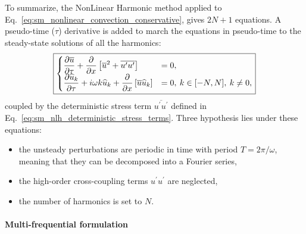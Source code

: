To summarize, the NonLinear Harmonic
method applied to Eq.~\ref{eq:sm_nonlinear_convection_conservative},
gives $2N + 1$ equations. A pseudo-time ($\tau$) derivative is
added to march the equations in pseudo-time to the steady-state 
solutions of all the harmonics:
\begin{equation}
	\fbox{$
	\begin{cases}
		\displaystyle \frac{\partial \overline{u}}{\partial \tau} + 
		\frac{\partial}{\partial x}
			\left[\overline{u}^2 + 
			\overline{u^\prime u^\prime}\right] &=
			0, \\
		\displaystyle \frac{\partial \widehat{u}_k}{\partial \tau} + 
		i \omega k \widehat{u}_k + 
			\frac{\partial}{\partial x} 
			\left[ \overline{u} \widehat{u}_k\right] &= 
			0, \: k \in [-N, N], \: k \neq 0,
	\end{cases}
	$}
	\label{eq:sm_nlh_subset_eq}
\end{equation}
coupled by the deterministic stress term $\overline{u^\prime u^\prime}$
defined in Eq.~\ref{eq:sm_nlh_deterministic_stress_terms}.
Three hypothesis lies under these equations:
\begin{itemize}
	\item the unsteady perturbations are periodic in time
	with period $T= 2 \pi / \omega$, 
	meaning that they can be decomposed into a Fourier series,
	\item the high-order cross-coupling terms $u^\prime u^\prime$
	are neglected,
	\item the number of harmonics is set to $N$.
\end{itemize}

\paragraph{Multi-frequential formulation}

